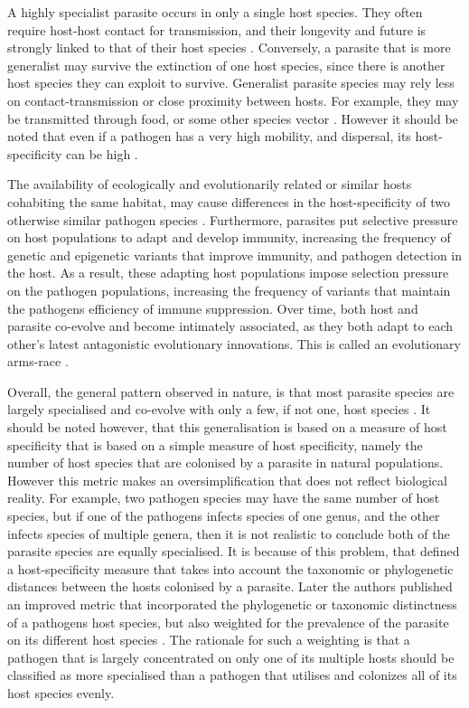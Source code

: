 A highly specialist parasite occurs in only a single host species. They often require host-host contact for transmission, and their longevity and future is strongly linked to that of their host species \parencite{Poulin2008}. Conversely, a parasite that is more generalist may survive the extinction of one host species, since there is another host species they can exploit to survive. Generalist parasite species may rely less on contact-transmission or close proximity between hosts. For example, they may be transmitted through food, or some other species vector \parencite{Pedersen2005PatternsPrimates}. However it should be noted that even if a pathogen has a very high mobility, and dispersal, its host-specificity can be high \parencite{Poulin2008}.

The availability of ecologically and evolutionarily related or similar hosts cohabiting the same habitat, may cause differences in the host-specificity of two otherwise similar pathogen species \parencite{Jex2006TheSpecificity.}. Furthermore, parasites put selective pressure on host populations to adapt and develop immunity, increasing the frequency of genetic and epigenetic variants that improve immunity, and pathogen detection in the host. As a result, these adapting host populations impose selection pressure on the pathogen populations, increasing the frequency of variants that maintain the pathogens efficiency of immune suppression. Over time, both host and parasite co-evolve and become intimately associated, as they both adapt to each other's latest antagonistic evolutionary innovations. This is called an evolutionary arms-race \parencite{Boutemy2011,Buckling2002,Cooper2008,Kemen2012,Lamour2010}.

Overall, the general pattern observed in nature, is that most parasite species are largely specialised and co-evolve with only a few, if not one, host species \parencite{McMullan2015a}. It should be noted however, that this generalisation is based on a measure of host specificity that is based on a simple measure of host specificity, namely the number of host species that are colonised by a parasite in natural populations. However this metric makes an oversimplification that does not reflect biological reality. For example, two pathogen species may have the same number of host species, but if one of the pathogens infects species of one genus, and the other infects species of multiple genera, then it is not realistic to conclude both of the parasite species are equally specialised. It is because of this problem, that \cite{Poulin2003ParasiteSpecificity} defined a host-specificity measure that takes into account the taxonomic or phylogenetic distances between the hosts colonised by a parasite. Later the authors published an improved metric that incorporated the phylogenetic or taxonomic distinctness of a pathogens host species, but also weighted for the prevalence of the parasite on its different host species \parencite{Poulin2005CombiningSpecificity.}⁠. The rationale for such a weighting is that a pathogen that is largely concentrated on only one of its multiple hosts should be classified as more specialised than a pathogen that utilises and colonizes all of its host species evenly.

